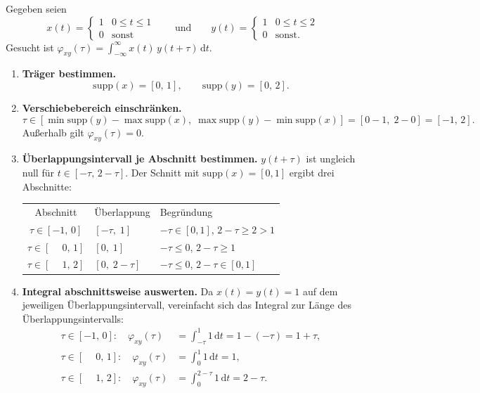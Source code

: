 \begin{beispiel}

Gegeben seien
$$
x(t) = \begin{cases} 1 & 0 \leq t \leq 1 \\ 0 & \text{sonst} \end{cases}
\qquad \text{und} \qquad
y(t) = \begin{cases} 1 & 0 \leq t \leq 2 \\ 0 & \text{sonst.} \end{cases}
$$
Gesucht ist $\varphi_{xy}(\tau) = \int_{-\infty}^{\infty} x(t)\,y(t+\tau)\,\mathrm{d}t$.

\begin{enumerate}
  \item \textbf{Träger bestimmen.}
  $$\mathrm{supp}(x) = [0,\,1], \qquad \mathrm{supp}(y) = [0,\,2].$$

  \item \textbf{Verschiebebereich einschränken.}
  $$\tau \in [\min\mathrm{supp}(y) - \max\mathrm{supp}(x),\;
              \max\mathrm{supp}(y) - \min\mathrm{supp}(x)]
         = [0-1,\; 2-0] = [-1,\,2].$$
  Außerhalb gilt $\varphi_{xy}(\tau) = 0$.

  \item \textbf{Überlappungsintervall je Abschnitt bestimmen.}
  $y(t+\tau)$ ist ungleich null für $t \in [-\tau,\, 2-\tau]$.
  Der Schnitt mit $\mathrm{supp}(x) = [0,1]$ ergibt drei Abschnitte:

  \begin{center}
  \begin{tabular}{cll}
    Abschnitt & Überlappung & Begründung \\[3pt]
    $\tau \in [-1,\,0]$ & $[-\tau,\;1]$ & $-\tau\in[0,1]$, $2{-}\tau \geq 2 > 1$ \\
    $\tau \in [\phantom{-}0,\,1]$ & $[0,\;1]$    & $-\tau\leq 0$, $2{-}\tau \geq 1$ \\
    $\tau \in [\phantom{-}1,\,2]$ & $[0,\;2{-}\tau]$ & $-\tau\leq 0$, $2{-}\tau\in[0,1]$
  \end{tabular}
  \end{center}

  \item \textbf{Integral abschnittsweise auswerten.}
  Da $x(t) = y(t) = 1$ auf dem jeweiligen Überlappungsintervall, vereinfacht sich
  das Integral zur Länge des Überlappungsintervalls:
  \begin{align*}
    \tau \in [-1,\,0]\colon\quad
      \varphi_{xy}(\tau) &= \int_{-\tau}^{1} 1\,\mathrm{d}t = 1 - (-\tau) = 1+\tau, \\
    \tau \in [\phantom{-}0,\,1]\colon\quad
      \varphi_{xy}(\tau) &= \int_{0}^{1} 1\,\mathrm{d}t = 1, \\
    \tau \in [\phantom{-}1,\,2]\colon\quad
      \varphi_{xy}(\tau) &= \int_{0}^{2-\tau} 1\,\mathrm{d}t = 2-\tau.
  \end{align*}


\end{enumerate}
\end{beispiel}
